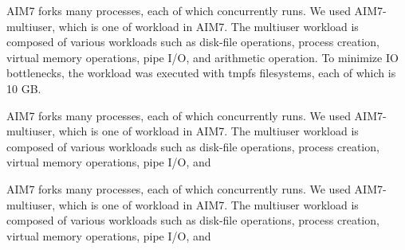 \fi


\ifkor
AIM7 forks many processes, each of which concurrently runs. 
We used AIM7-multiuser, which is one of workload in AIM7.
The multiuser workload is composed of various workloads such as disk-file
operations, process creation, virtual memory operations, pipe I/O, and
arithmetic operation.
To minimize IO bottlenecks, the workload was executed with tmpfs filesystems, each
of which is 10 GB.
\else

\fi




\ifkor
AIM7 forks many processes, each of which concurrently runs. 
We used AIM7-multiuser, which is one of workload in AIM7.
The multiuser workload is composed of various workloads such as disk-file
operations, process creation, virtual memory operations, pipe I/O, and
\else

\fi



\ifkor
AIM7 forks many processes, each of which concurrently runs. 
We used AIM7-multiuser, which is one of workload in AIM7.
The multiuser workload is composed of various workloads such as disk-file
operations, process creation, virtual memory operations, pipe I/O, and
\else

\fi
